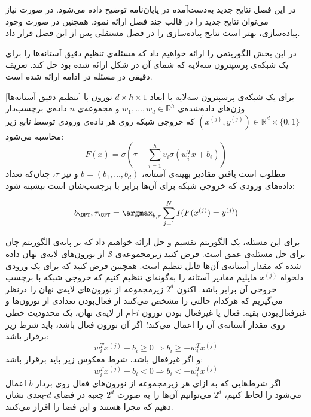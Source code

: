 

در این فصل نتایج جدید به‌دست‌آمده در پایان‌نامه توضیح داده می‌شود.
در صورت نیاز می‌توان نتایج جدید را در قالب چند فصل ارائه نمود.
همچنین در صورت وجود پیاده‌سازی، بهتر است نتایج پیاده‌سازی را 
در فصل مستقلی پس از این فصل قرار داد.


در این بخش الگوریتمی را ارائه خواهیم داد که مسئله‌ی تنظیم دقیق آستانه‌ها را برای یک شبکه‌ی پرسپترون سه‌لایه که شمای آن در شکل  ارائه شده بود حل کند. تعریف دقیقی در مسئله در ادامه ارائه شده است.


[تنظیم دقیق آستانه‌ها]
برای یک شبکه‌ی پرسپترون سه‌لایه با ابعاد
$d \times h \times 1$
نورون با وزن‌های داده‌شده‌ی
$w_1, \dots, w_d \in \mathbb{R}^{h}$
و مجموعه‌ی $n$ داده‌ی برچسب‌دار
$(x^{(j)}, y^{(j)}) \in \mathbb{R}^{d} \times \{0, 1\}$
که خروجی شبکه روی هر داده‌ی ورودی توسط تابع زیر محاسبه می‌شود:
\begin{equation} \label{eq:network}
	F(x) = \sigma\left( \tau + \sum_{i=1}^h v_i \sigma(w_i^T x + b_i)\right)
\end{equation}
مطلوب است یافتن مقادیر بهینه‌ی آستانه، $b=(b_1, \dots, b_d)$ و نیز $\tau$، چنان‌که تعداد داده‌های ورودی که خروجی شبکه برای آن‌ها برابر با برچسب‌شان است بیشینه شود:

\begin{equation*} \label{eq:argmax}
	b_{\OPT}, \tau_{\OPT} = \argmax_{b, \tau} \sum_{j=1}^N I(F(x^{(j)}) = y^{(j)})
\end{equation*}


برای این مسئله، یک الگوریتم تقسیم و حل ارائه خواهیم داد که بر پایه‌ی الگوریتم چان  برای حل مسئله‌ی عمق است. فرض کنید زیرمجموعه‌ی $\mathcal{S}$ از نورون‌های لایه‌ی نهان داده شده که مقدار آستانه‌ی آن‌ها قابل تنظیم است. همچنین فرض کنید که برای یک ورودی دلخواه
$x^{(j)}$
مایلیم مقادیر آستانه را به‌گونه‌ای تنظیم کنیم که خروجی شبکه با برچسب خروجی آن برابر باشد. اکنون
$2^d$
زیرمجموعه از نورون‌های لایه‌ی نهان را درنظر می‌گیریم که هرکدام حالتی را مشخص می‌کنند از فعال‌بودن تعدادی از نورون‌ها و غیرفعال‌بودن بقیه. فعال یا غیرفعال بودن نورون $i$-ام از لایه‌ی نهان، یک محدودیت خطی روی مقدار آستانه‌ی آن را اعمال می‌کند؛ اگر آن نورون فعال باشد، باید شرط زیر برقرار باشد:
$$w_i^T x^{(j)} + b_i \ge 0 \Rightarrow b_i \ge -w_i^T x^{(j)}$$
و اگر غیرفعال باشد، شرط معکوس زیر باید برقرار باشد:
$$w_i^T x^{(j)} + b_i < 0 \Rightarrow b_i < -w_i^T x^{(j)}$$
اگر شرط‌هایی که به ازای هر زیرمجموعه از نورون‌های فعال روی بردار $b$ اعمال می‌شود را لحاظ کنیم،
$2^d$
می‌توانیم آن‌ها را به صورت
$2^d$
جعبه در فضای $d$-بعدی نشان دهیم که مجزا هستند و این فضا را افراز می‌کنند.

